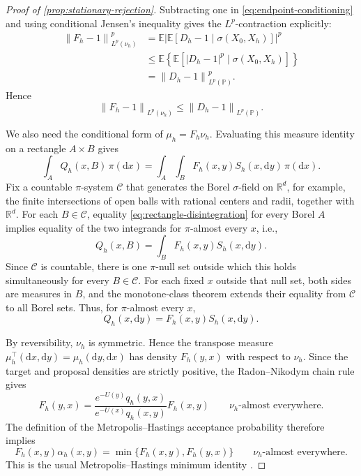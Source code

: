 \documentclass[11pt]{article}
\newcommand{\R}{\mathbb R}
\newcommand{\E}{\mathbb E}
\newcommand{\norm}[1]{\left\lVert #1\right\rVert}
\newcommand{\1}{\mathbf 1}
\newcommand{\df}{\mathrm{d}}
\begin{document}
\begin{proof}[Proof of \cref{prop:stationary-rejection}]
		Subtracting one in \eqref{eq:endpoint-conditioning} and using conditional
		Jensen's inequality gives the \(L^p\)-contraction explicitly:
		\begin{align*}
			\norm{F_h-1}_{L^p(\nu_h)}^p
			&=\E\left|
			\E[D_h-1\mid\sigma(X_0,X_h)]
			\right|^p\\
			&\leq\E\left\{
			\E\left[
			|D_h-1|^p\mid\sigma(X_0,X_h)
			\right]
			\right\} \\
			&=\norm{D_h-1}_{L^p(\mathbb P)}^p.
		\end{align*}
		Hence
		\begin{equation}\label{eq:F-contraction}
			\norm{F_h-1}_{L^p(\nu_h)}
			\leq
			\norm{D_h-1}_{L^p(\mathbb P)}.
		\end{equation}
		
		We also need the conditional form of \(\mu_h=F_h\nu_h\).  Evaluating this
		measure identity on a rectangle \(A\times B\) gives
		\begin{equation}\label{eq:rectangle-disintegration}
			\int_AQ_h(x,B)\,\pi(\df x)
			=\int_A\int_BF_h(x,y)S_h(x,\df y)\,\pi(\df x).
		\end{equation}
		Fix a countable \(\pi\)-system \(\mathcal C\) that generates the Borel
		\(\sigma\)-field on \(\R^d\), for example, the finite intersections of open
		balls with rational centers and radii, together with \(\R^d\).  For each
		\(B\in\mathcal C\), equality
		\eqref{eq:rectangle-disintegration} for every Borel \(A\) implies equality
		of the two integrands for \(\pi\)-almost every \(x\), i.e.,
		\[
		Q_h(x,B) = \int_B F_h(x,y) S_h(x, \df y).
		\]
		Since
		\(\mathcal C\) is countable, there is one \(\pi\)-null set outside which
		this holds simultaneously for every \(B\in\mathcal C\).  For each fixed
		\(x\) outside that null set, both sides are measures in \(B\), and the
		monotone-class theorem extends their equality from \(\mathcal C\) to all
		Borel sets.  Thus, for \(\pi\)-almost every \(x\),
		\begin{equation}\label{eq:conditional-F}
			Q_h(x,\df y)=F_h(x,y)S_h(x,\df y).
		\end{equation}
		
		By reversibility, \(\nu_h\) is symmetric. Hence the transpose
		measure \(\mu_h^\top(\df x,\df y)=\mu_h(\df y,\df x)\)
		has density \(F_h(y,x)\) with respect to \(\nu_h\).
		Since the target and proposal densities are strictly positive,
		the Radon--Nikodym chain rule gives
		\[
		F_h(y,x)
		=
		\frac{e^{-U(y)}q_h(y,x)}
		{e^{-U(x)}q_h(x,y)}
		F_h(x,y)
		\qquad \nu_h\text{-almost everywhere}.
		\]
		The definition of the Metropolis--Hastings acceptance probability
		therefore implies
		\[
		F_h(x,y)\alpha_h(x,y)
		=
		\min\{F_h(x,y),F_h(y,x)\}
		\qquad \nu_h\text{-almost everywhere}.
		\]
		This is the usual Metropolis--Hastings minimum identity
		\citep{Tierney1998,BilleraDiaconis2001}.
		

\end{proof}
\end{document}
